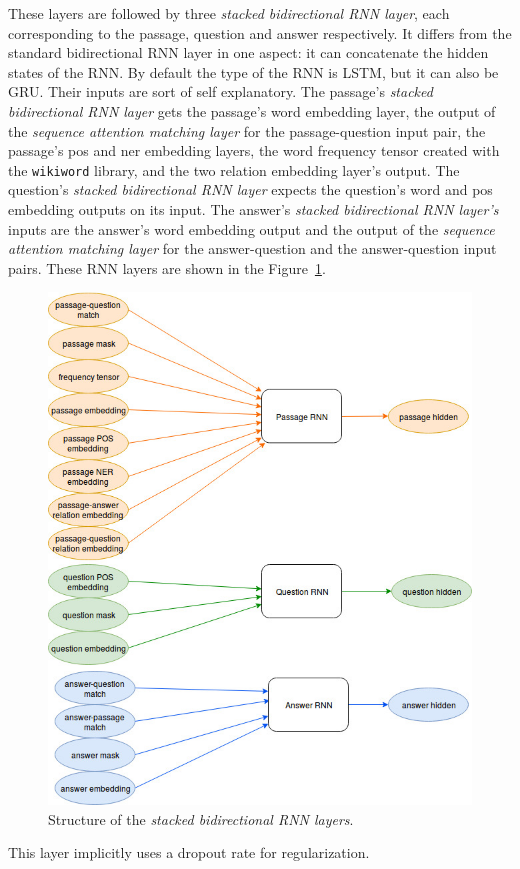 These layers are followed by three \textit{stacked bidirectional RNN layer}, each corresponding to the passage, question and answer respectively. It differs from the standard bidirectional RNN layer in one aspect: it can concatenate the hidden states of the RNN. By default the type of the RNN is LSTM, but it can also be GRU. Their inputs are sort of self explanatory. The passage's \textit{stacked bidirectional RNN layer} gets the passage's word embedding layer, the output of the \textit{sequence attention matching layer} for the passage-question input pair, the passage's pos and ner embedding layers, the word frequency tensor created with the \texttt{wikiword} library, and the two relation embedding layer's output. The question's \textit{stacked bidirectional RNN layer} expects the question's word and pos embedding outputs on its input. The answer's \textit{stacked bidirectional RNN layer's} inputs are the answer's word embedding output and  the output of the \textit{sequence attention matching layer} for the answer-question and the answer-question input pairs. These RNN layers are shown in the Figure~\ref{fig:rnn}.
\begin{figure}[h!]
	\centering
	\includegraphics[scale=0.4]{TriAN_rnn.jpg}
	\caption{Structure of the \textit{stacked bidirectional RNN layers}.}
	\label{fig:rnn}
\end{figure}
This layer implicitly uses a dropout rate for regularization.


